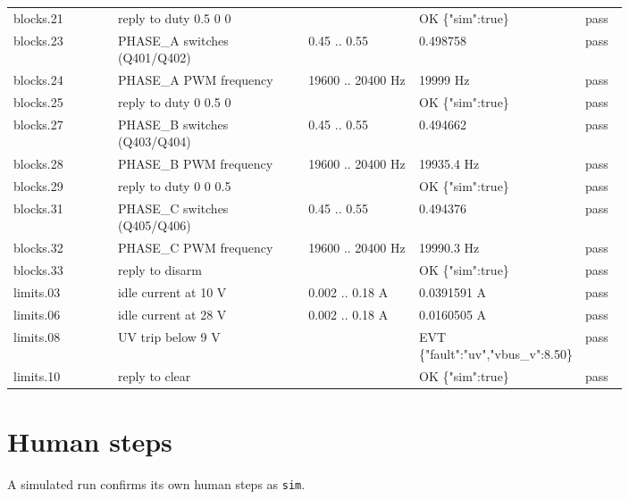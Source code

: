\documentclass[11pt]{article}
\begin{document}
{\begin{longtable}{p{0.17\linewidth}p{0.31\linewidth}p{0.18\linewidth}p{0.14\linewidth}l}
\mbox{blocks.21} & reply to duty 0.5 0 0 &  & OK \{"sim":true\}  & pass \\
\mbox{blocks.23} & PHASE\_A switches (Q401/Q402) & 0.45 .. 0.55 & 0.498758  & pass \\
\mbox{blocks.24} & PHASE\_A PWM frequency & 19600 .. 20400 Hz & 19999 Hz & pass \\
\mbox{blocks.25} & reply to duty 0 0.5 0 &  & OK \{"sim":true\}  & pass \\
\mbox{blocks.27} & PHASE\_B switches (Q403/Q404) & 0.45 .. 0.55 & 0.494662  & pass \\
\mbox{blocks.28} & PHASE\_B PWM frequency & 19600 .. 20400 Hz & 19935.4 Hz & pass \\
\mbox{blocks.29} & reply to duty 0 0 0.5 &  & OK \{"sim":true\}  & pass \\
\mbox{blocks.31} & PHASE\_C switches (Q405/Q406) & 0.45 .. 0.55 & 0.494376  & pass \\
\mbox{blocks.32} & PHASE\_C PWM frequency & 19600 .. 20400 Hz & 19990.3 Hz & pass \\
\mbox{blocks.33} & reply to disarm &  & OK \{"sim":true\}  & pass \\
\mbox{limits.03} & idle current at 10 V & 0.002 .. 0.18 A & 0.0391591 A & pass \\
\mbox{limits.06} & idle current at 28 V & 0.002 .. 0.18 A & 0.0160505 A & pass \\
\mbox{limits.08} & UV trip below 9 V &  & EVT \{"fault":"uv","vbus\_v":8.50\}  & pass \\
\mbox{limits.10} & reply to clear &  & OK \{"sim":true\}  & pass \\
\hline
\end{longtable}
}

\section{Human steps}
\noindent A simulated run confirms its own human steps as \texttt{sim}.
\end{document}
